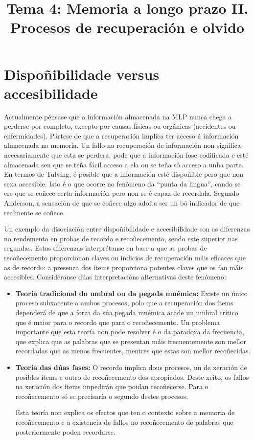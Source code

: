 \documentclass[a4paper,11pt]{article}
\title{Tema 4: Memoria a longo prazo II. Procesos de recuperación e olvido}
\date{} %
\begin{document}
  

\maketitle 

\section{Dispoñibilidade versus accesibilidade}
Actualmente pénsase que a información almacenada na MLP nunca chega a perderse por completo, excepto por causas físicas ou orgánicas (accidentes ou enfermidades). Pártese de que a recuperación implica ter acceso á información almacenada na memoria. Un fallo na recuperación de información non significa necesariamente que esta se perdera: pode que a información fose codificada e esté almacenada sen que se teña fácil acceso a ela ou se teña só acceso a unha parte. En termos de Tulving, é posible que a información esté dispoñible pero que non sexa accesible. Isto é o que ocorre no fenómeno da ``punta da lingua'', cando se cre que se coñece certa información pero non se é capaz de recordala. Segundo Anderson, a sensación de que se coñece algo adoita ser un bó indicador de que realmente se coñece.  

Un exemplo da disociación entre dispoñibilidade e accesibilidade son as diferenzas no rendemento en probas de recordo e recoñecemento, sendo este superior nas segundas. Estas diferenzas interprétanse en base a que as probas de recoñecemento proporcionan claves ou indicios de recuperación máis eficaces que as de recordo: a presenza dos ítems proporciona potentes claves que os fan máis accesibles. Considéranse dúas interpretacións alternativas deste fenómeno:
\begin{itemize}
	\item \textbf{Teoría tradicional do umbral ou da pegada mnémica:} Existe un único proceso 
	subxacente a ambos procesos, polo que a recuperación dos ítems dependerá de que a forza da súa 
	pegada mnémica acade un umbral crítico que é maior para o recordo que para o recoñecemento. 
	Un problema importante que esta teoría non pode resolver é o da paradoxa da frecuencia, que 
	explica que as palabras que se presentan máis frecuentemente son mellor recordadas que as menos 
	frecuentes, mentres que estas son mellor recoñecidas. 
	\item \textbf{Teoría das dúas fases:} O recordo implica dous procesos, un de xeración de 
	posibles ítems e outro de recoñecemento dos apropiados. Deste xeito, os fallos na xeración dos 
	ítems impedirán que poidan recoñecerse. Para o recoñecemento só se precisaría o segundo destes 
	procesos.
	
	Esta teoría non explica os efectos que ten o contexto sobre a memoria de recoñecemento e a 
	existencia de fallos no recoñecemento de palabras que posteriormente poden recordarse.
\end{itemize}
\end{document}
